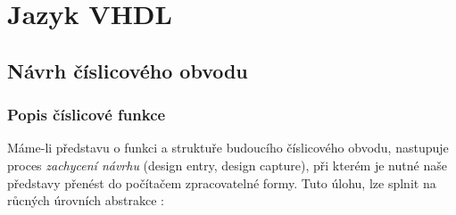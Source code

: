 \chapter{Jazyk VHDL}
\minitoc
\newpage
  \section{Návrh číslicového obvodu}
    \subsection{Popis číslicové funkce}
      Máme-li představu o funkci a struktuře budoucího číslicového obvodu, nastupuje proces \emph{zachycení návrhu} (design
      entry, design capture), při kterém je nutné naše představy přenést do počítačem zpracovatelné formy. Tuto úlohu, lze splnit
      na růcných úrovních abstrakce \cite[s.~19]{Stastny2010}:
